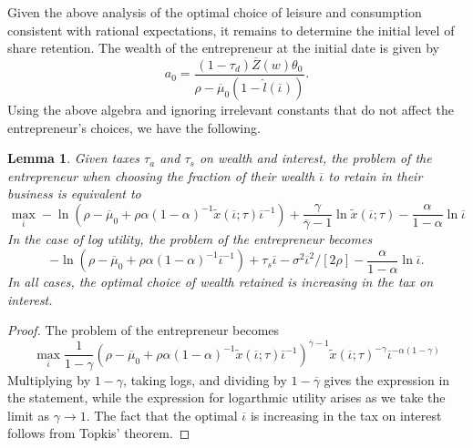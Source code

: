 \documentclass[11pt]{article}
\theoremstyle{plain}
\newtheorem{lemma}[thm]{Lemma}
\begin{document}
Given the above analysis of the optimal choice of leisure and consumption consistent with rational expectations, it remains to determine the initial level of share retention. The wealth of the entrepreneur at the initial date is given by 
$$ %
a_0 = \frac{(1-\tau_d) \overline{Z}(w) \theta_0}{\rho - \overline{\mu}_0(1-\hat{l}(\overline{\iota}))}.
$$
Using the above algebra and ignoring irrelevant constants that do not affect the entrepreneur's choices, we have the following. 


\begin{lemma} \label{arb_eq}
Given taxes $\tau_a$ and $\tau_s$ on wealth and interest, the problem of the entrepreneur when choosing the fraction of their wealth $\overline{\iota}$ to retain in their business is equivalent to 
\begin{equation}
\max_{\overline{\iota}} - \ln {\left(\rho - \overline{\mu}_0 + \rho\alpha (1-\alpha)^{-1}\tilde{x}(\overline{\iota};\tau)\overline{\iota}^{-1}\right)}
+\frac{\gamma}{\overline{\gamma}-1}\ln \tilde{x}(\overline{\iota};\tau) - \frac{\alpha}{1-\alpha} \ln \overline{\iota}
\label{initial_prob}
\end{equation}
In the case of log utility, the problem of the entrepreneur becomes
\begin{equation}
-\ln {\left(\rho - \overline{\mu}_0 + \rho\alpha (1-\alpha)^{-1}\overline{\iota}^{-1}\right)} + \tau_s\overline{\iota} - \sigma^2\overline{\iota}^2/[2\rho] - \frac{\alpha}{1-\alpha}\ln \overline{\iota}.
\label{initial_prob3}
\end{equation}
In all cases, the optimal choice of wealth retained is increasing in the tax on interest. 
\end{lemma}

\begin{proof}
The problem of the entrepreneur becomes 
\begin{equation}
\max_{\overline{\iota}} \frac{1}{1-\gamma}{\left(\rho - \overline{\mu}_0 + \rho\alpha (1-\alpha)^{-1}\tilde{x}(\overline{\iota};\tau)\overline{\iota}^{-1}\right)}^{\overline{\gamma}-1}\tilde{x}(\overline{\iota};\tau)^{-\gamma}\overline{\iota}^{-\alpha(1-\gamma)}
\label{initial_prob0}
\end{equation}
Multiplying by $1 - \gamma$, taking logs, and dividing by $1-\overline{\gamma}$ gives the expression in the statement, while the expression for logarthmic utility arises as we take the limit as $\gamma \rightarrow 1$. The fact that the optimal $\overline{\iota}$ is increasing in the tax on interest follows from Topkis' theorem. 
\end{proof} %
\end{document}
